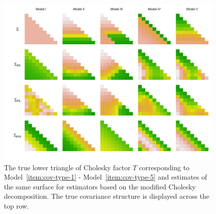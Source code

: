 
\begin{figure}[H] \label{fig:chol-estimate-lattice}
\centering
\caption{The true lower triangle of Cholesky factor $T$ corresponding to Model~\ref{item:cov-type-1} - Model~\ref{item:cov-type-5} and estimates of the same surface for estimators based on the modified Cholesky decomposition. The true covariance structure is displayed across the top row.}
  \includegraphics[width = 1\textwidth]{../img/chapter-4/cholesky-estimate-lattice}
\end{figure}